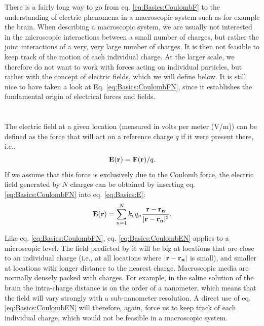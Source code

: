 There is a fairly long way to go from eq. \ref{eq:Basics:CoulombF} to the understanding of electric phenomena in a macroscopic system such as for example the brain. When describing a macroscopic system, we are usually not interested in the microscopic interactions between a small number of charges, but rather the joint interactions of a very, very large number of charges. It is then not feasible to keep track of the motion of each individual charge. At the larger scale, we therefore do not want to work with forces acting on individual particles, but rather with the concept of electric fields, which we will define below. It is still nice to have taken a look at  Eq. \ref{eq:Basics:CoulombFN}, since it establishes the fundamental origin of electrical forces and fields. 


\section{}
\label{sec:Basics:Fields} 
The electric field at a given location (measured in volts per meter (V/m)) can be defined as the force that will act on a reference charge $q$ if it were present there, i.e., 
\begin{equation}
{\bf E}({\bf r}) = {\bf F}({\bf r})/q.
\label{eq:Basics:E}
\end{equation}
If we assume that this force is exclusively due to the Coulomb force, the electric field generated by $N$ charges can be obtained by inserting eq. \ref{eq:Basics:CoulombFN} into eq. \ref{eq:Basics:E}:
\begin{equation}
{\bf E}({\bf r}) = \sum_{n=1}^{N} k_e q_n \frac{{\bf r}-{\bf r_n}}{|{\bf r}-{\bf r_n}|^3}.
\label{eq:Basics:CoulombEN}
\end{equation}

Like eq. \ref{eq:Basics:CoulombFN}, eq. \ref{eq:Basics:CoulombEN} applies to a microscopic level. The field predicted by it will be big at locations that are close to an individual charge (i.e., at all locations where $|{\bf r}-{\bf r_n}|$ is small), and smaller at locations with longer distance to the nearest charge. Macroscopic media are normally densely packed with charges. For example, in the saline solution of the brain the intra-charge distance is on the order of a nanometer, which means that the field will vary strongly with a sub-nanometer resolution. A direct use of eq. \ref{eq:Basics:CoulombEN} will therefore, again, force us to keep track of each individual charge, which would not be feasible in a macroscopic system.

